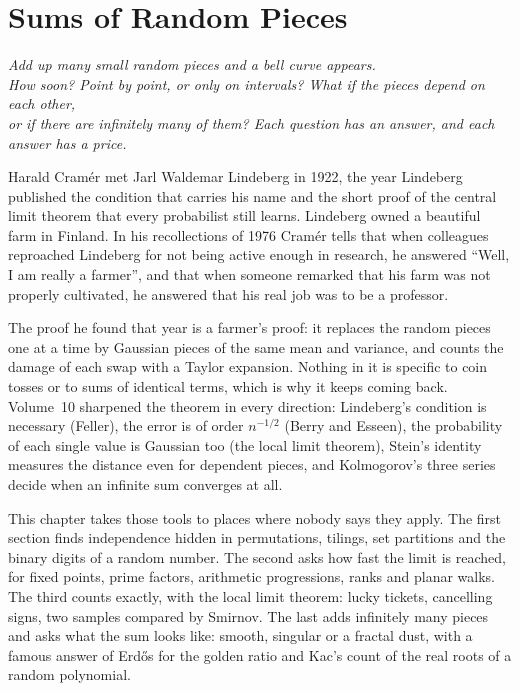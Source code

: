 \chapter{Sums of Random Pieces}

\begin{center}\itshape
Add up many small random pieces and a bell curve appears.\\
How soon? Point by point, or only on intervals? What if the pieces depend on each other,\\
or if there are infinitely many of them? Each question has an answer, and each answer has a price.
\end{center}

Harald Cram\'er met Jarl Waldemar Lindeberg in 1922, the year Lindeberg published the condition that carries his name and the short proof of the
central limit theorem that every probabilist still learns. Lindeberg owned a beautiful farm in Finland. In his recollections of 1976 Cram\'er tells
that when colleagues reproached Lindeberg for not being active enough in research, he answered ``Well, I am really a farmer'', and that when someone
remarked that his farm was not properly cultivated, he answered that his real job was to be a professor.

The proof he found that year is a farmer's proof: it replaces the random pieces one at a time by Gaussian pieces of the same mean and variance, and
counts the damage of each swap with a Taylor expansion. Nothing in it is specific to coin tosses or to sums of identical terms, which is why it keeps
coming back. Volume~10 sharpened the theorem in every direction: Lindeberg's condition is necessary (Feller), the error is of order $n^{-1/2}$ (Berry and
Esseen), the probability of each single value is Gaussian too (the local limit theorem), Stein's identity measures the distance even for dependent
pieces, and Kolmogorov's three series decide when an infinite sum converges at all.

This chapter takes those tools to places where nobody says they apply. The first section finds independence hidden in permutations, tilings, set
partitions and the binary digits of a random number. The second asks how fast the limit is reached, for fixed points, prime factors, arithmetic
progressions, ranks and planar walks. The third counts exactly, with the local limit theorem: lucky tickets, cancelling signs, two samples
compared by Smirnov. The last adds infinitely many pieces and asks what the sum looks like: smooth, singular or a fractal dust, with a famous answer of
Erd\H os for the golden ratio and Kac's count of the real roots of a random polynomial.

